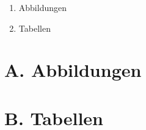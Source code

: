 
\addchap{\langanhang}

{\Large
\begin{enumerate}[label=\Alph*.]
	\item Abbildungen
	\item Tabellen
\end{enumerate}
}
\pagebreak




\section*{A. Abbildungen} \label{appendix-a}

\pagebreak

\section*{B. Tabellen} \label{appendix-b}

\pagebreak
